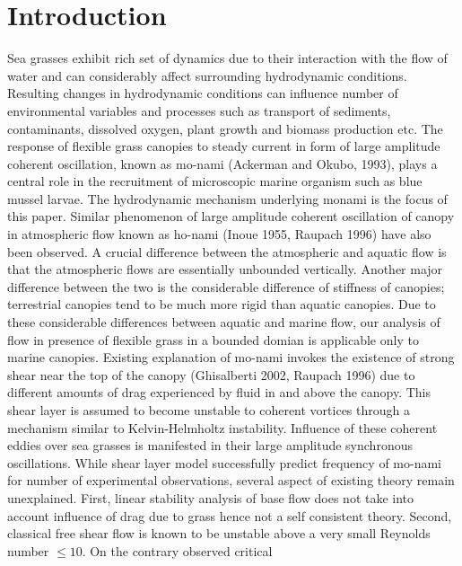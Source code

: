 \documentclass[aps,prl,twocolumn,showpacs,superscriptaddress,groupedaddress,10pt]{revtex4-1}  %
\begin{document}
\section{Introduction}
Sea grasses exhibit rich set of dynamics due to their interaction with the flow of water and can considerably affect surrounding hydrodynamic conditions.
Resulting changes in hydrodynamic conditions can influence number of environmental variables and processes such as 
transport of sediments, contaminants, dissolved oxygen, plant growth and biomass production etc. 
The response of flexible grass canopies to steady current in form of large amplitude coherent oscillation, known as mo-nami (Ackerman and Okubo, 1993), plays a central role
in the recruitment of microscopic marine organism such as blue mussel larvae. The hydrodynamic mechanism underlying monami is the focus of this paper. 
\newline
Similar phenomenon of large amplitude coherent oscillation of canopy in atmospheric flow known as ho-nami (Inoue 1955, Raupach 1996) have also been observed.
A crucial difference between the atmospheric and aquatic flow is that the atmospheric flows are essentially unbounded vertically. Another major
difference between the two is the considerable difference of stiffness of canopies; terrestrial canopies tend to be much more rigid than aquatic canopies.
Due to these considerable differences between aquatic and marine flow, our analysis of flow in presence of flexible grass in a bounded domian is applicable only to marine canopies. 
\newline   
Existing explanation of mo-nami invokes the existence of strong shear near the top of the canopy (Ghisalberti 2002, Raupach 1996) due to
different amounts of drag experienced by fluid in and above the canopy. This shear layer is assumed to become unstable to coherent vortices through a mechanism similar to 
Kelvin-Helmholtz instability. Influence of these coherent eddies over sea grasses is manifested in their large amplitude synchronous oscillations.
\newline
While shear layer model successfully predict frequency of mo-nami for number of experimental observations,
several aspect of existing theory remain unexplained. First, linear stability analysis of base flow does not take into account influence of drag due to grass hence not a self 
consistent theory. Second, classical free shear flow is known to be unstable above a very small Reynolds number $\leq 10 $. On the contrary observed critical 
\end{document}
